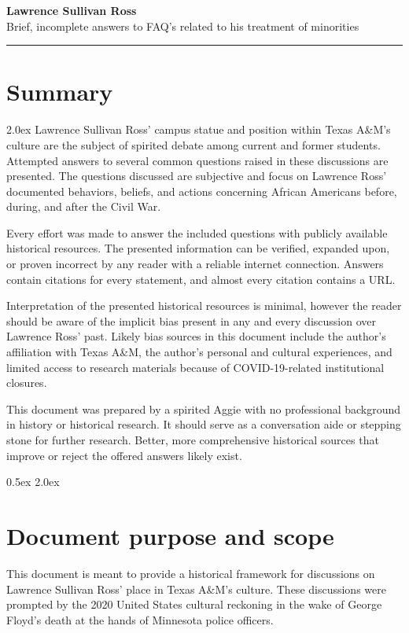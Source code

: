 \documentclass[12pt]{article}
\begin{document}
\Large{\textbf{Lawrence Sullivan Ross \\}}
\large{Brief, incomplete answers to FAQ's related to his treatment of minorities \\}
\rule{\textwidth}{1pt}

\section{Summary}
\parskip 2.0ex
Lawrence Sullivan Ross' campus statue and position within Texas A\&M's culture are the subject of spirited debate among current and former students. Attempted answers to several common questions raised in these discussions are presented. The questions discussed are subjective and focus on Lawrence Ross' documented behaviors, beliefs, and actions concerning African Americans before, during, and after the Civil War. 

Every effort was made to answer the included questions with publicly available historical resources. The presented information can be verified, expanded upon, or proven incorrect by any reader with a reliable internet connection. Answers contain citations for every statement, and almost every citation contains a URL. 

Interpretation of the presented historical resources is minimal, however the reader should be aware of the implicit bias present in any and every discussion over Lawrence Ross' past. Likely bias sources in this document include the author's affiliation with Texas A\&M, the author's personal and cultural experiences, and limited access to research materials because of COVID-19-related institutional closures.

This document was prepared by a spirited Aggie with no professional background in history or  historical research. It should serve as a conversation aide or stepping stone for further research. Better, more comprehensive historical sources that improve or reject the offered answers likely exist. 

\parskip 0.5ex
\newpage
\tableofcontents
\parskip 2.0ex

\newpage
\section{Document purpose and scope}
This document is meant to provide a historical framework for discussions on Lawrence Sullivan Ross' place in Texas A\&M's culture. These discussions were prompted by the 2020 United States cultural reckoning in the wake of George Floyd's death at the hands of Minnesota police officers. 
\end{document}

